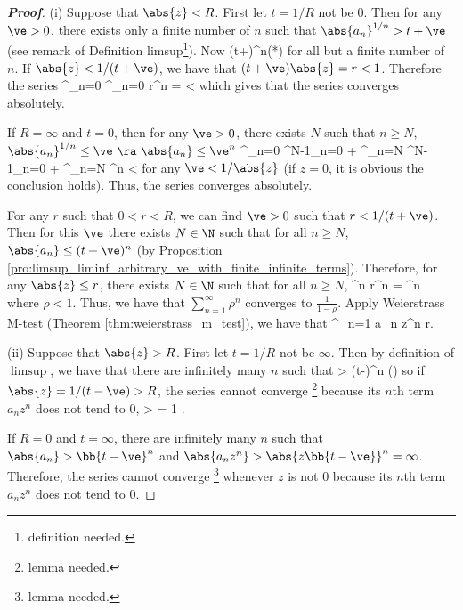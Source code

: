 \begin{proof}[\bf Proof]%
\ben
\item [(i)] Suppose that $\abs{z}< R$. First let $t = 1/R$ not be 0. Then for any $\ve>0$, there exists only a finite number of $n$ such that $\abs{a_n}^{1/n}  > t +\ve$ (see remark of Definition limsup\footnote{definition needed.}). Now
\be
{} \leq (t+\ve)^n\qquad (*)
\ee
for all but a finite number of $n$. If $\abs{z} < 1/(t+\ve)$, we have that $(t+\ve)\abs{z} = r<1$. Therefore the series
\be
\sum^\infty_{n=0}  \leq \sum^\infty_{n=0} r^n =  < \infty
\ee
which gives that the series converges absolutely.

If $R = \infty$ and $t = 0$, then for any $\ve > 0$, there exists $N$ such that $n\geq N$, $\abs{a_n}^{1/n} \leq \ve \ \ra\ \abs{a_n} \leq \ve^n$
\be
\sum^\infty_{n=0}  \leq \sum^{N-1}_{n=0}  + \sum^\infty_{n=N}  \leq \sum^{N-1}_{n=0}  + \sum^\infty_{n=N} ^n <\infty
\ee
for any $\ve <1/\abs{z}$ (if $z = 0$, it is obvious the conclusion holds). Thus, the series converges absolutely.


For any $r$ such that $0<r<R$, we can find $\ve>0$ such that $r < 1/(t+\ve)$. Then for this $\ve$ there exists $N\in\N$ such that for all $n\geq N$, $\abs{a_n} \leq (t+\ve)^n$ (by Proposition \ref{pro:limsup_liminf_arbitrary_ve_with_finite_infinite_terms}). Therefore, for any $\abs{z} \leq r$, there exists $N\in \N$ such that for all $n\geq N$,
\be
{} \leq {}^n r^n = \rho^n
\ee
where $\rho < 1$. Thus, we have that $\sum^\infty_{n=1} \rho^n$ converges to $\frac 1{1-\rho}$. Apply Weierstrass M-test (Theorem \ref{thm:weierstrass_m_test}), we have that 
\be
\sum^\infty_{n=1} a_n z^n  \leq r.
\ee


\item [(ii)] Suppose that $\abs{z}> R$. First let $t = 1/R$ not be $\infty$. Then by definition of $\limsup$, we have that there are infinitely many $n$ such that
\be
{} > (t-\ve)^n \qquad (\dag)
\ee
so if $\abs{z} = 1/(t-\ve)> R$, the series cannot converge \footnote{lemma needed.} because its $n$th term $a_nz^n$ does not tend to 0,
\be
{} >  = 1 .
\ee

If $R = 0$ and $t =\infty$, there are infinitely many $n$ such that $\abs{a_n} > \bb{t-\ve}^n $ and $\abs{a_n z^n} > \abs{z\bb{t-\ve}}^n =\infty$. Therefore, the series cannot converge \footnote{lemma needed.} whenever $z$ is not 0 because its $n$th term $a_nz^n$ does not tend to 0.
\een
\end{proof}

